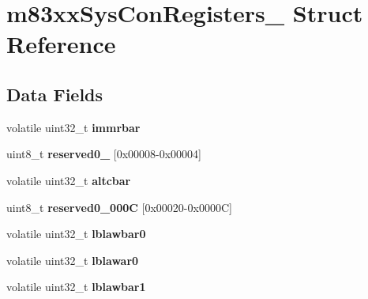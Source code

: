 \hypertarget{structm83xxSysConRegisters__}{}\section{m83xx\+Sys\+Con\+Registers\+\_\+ Struct Reference}
\label{structm83xxSysConRegisters__}
\subsection*{Data Fields}
\begin{DoxyCompactItemize}
\item 
\mbox{\label{structm83xxSysConRegisters___a575c184ea32d21eb2e0fa2f69a17128b}} 
volatile uint32\+\_\+t {\bfseries immrbar}
\item 
\mbox{\label{structm83xxSysConRegisters___af379acbc17ac74be263bf51deafbbeb5}} 
uint8\+\_\+t {\bfseries reserved0\+\_} \mbox{[}0x00008-\/0x00004\mbox{]}
\item 
\mbox{\label{structm83xxSysConRegisters___ac70fcb18e512639df62f60208e5dd5e9}} 
volatile uint32\+\_\+t {\bfseries altcbar}
\item 
\mbox{\label{structm83xxSysConRegisters___a4de3717e88f300ad54195dad5fe77716}} 
uint8\+\_\+t {\bfseries reserved0\+\_\+000C} \mbox{[}0x00020-\/0x0000\+C\mbox{]}
\item 
\mbox{\label{structm83xxSysConRegisters___ab9b0efe800142d480846724979195594}} 
volatile uint32\+\_\+t {\bfseries lblawbar0}
\item 
\mbox{\label{structm83xxSysConRegisters___a06799934924b714c6216da71614e187c}} 
volatile uint32\+\_\+t {\bfseries lblawar0}
\item 
\mbox{\label{structm83xxSysConRegisters___a4ad8e0b230c1057efa78eaf3a6acf0b9}} 
volatile uint32\+\_\+t {\bfseries lblawbar1}
\item 
\mbox{\label{structm83xxSysConRegisters___a060d8ab6edaeed7cd81e28c726b55995}} 

\end{DoxyCompactItemize}
